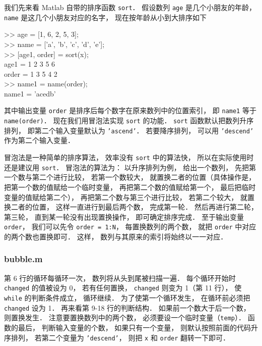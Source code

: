 

我们先来看 Matlab 自带的排序函数 \texttt{sort}． 假设数列 \texttt{age} 是几个小朋友的年龄， \texttt{name} 是这几个小朋友对应的名字， 现在按年龄从小到大排序如下
\begin{Command}
>> age = [1, 6, 2, 5, 3];\\
>> name = ['a', 'b', 'c', 'd', 'e'];\\
>> [age1, order] = sort(x);\\
age1 = 1 2 3 5 6\\
order = 1 3 5 4 2\\
>> name1 = name(order);\\
name1 = 'acedb'
\end{Command}
其中输出变量 \texttt{order} 是排序后每个数字在原来数列中的位置索引， 即 \texttt{name1} 等于 \texttt{name(order)}． 现在我们用冒泡法实现 \texttt{sort} 的功能． \texttt{sort} 函数默认把数列升序排列， 即第二个输入变量默认为 \texttt{'ascend'}． 若要降序排列， 可以用 \texttt{'descend'} 作为第二个输入变量．

冒泡法是一种简单的排序算法， 效率没有 \texttt{sort} 中的算法快， 所以在实际使用时还是建议用 \texttt{sort}． 冒泡法的算法为： 以升序排列为例， 给出一个数列， 先把第一个数与第二个进行比较， 若第一个数较大， 就置换二者的位置（具体操作是， 把第一个数的值赋给一个临时变量， 再把第二个数的值赋给第一个， 最后把临时变量的值赋给第二个）， 再把第二个数与第三个进行比较， 若第二个较大， 就置换二者的位置， 这样一直进行到最后两个数， 完成第一轮． 然后再进行第二轮， 第三轮， 直到某一轮没有出现置换操作， 即可确定排序完成． 至于输出变量 \texttt{order}， 我们可以先令 \texttt{order = 1:N}， 每置换数列的两个数， 就把 \texttt{order} 中对应的两个数也置换即可． 这样， 数列与其原来的索引将始终以一一对应． 

\subsubsection{bubble.m}


第 6 行的循环每循环一次， 数列将从头到尾被扫描一遍． 每个循环开始时 \texttt{changed} 的值被设为 0， 若有任何置换， \texttt{changed} 则变为 1（第 11 行）， 使 \texttt{while} 的判断条件成立， 循环继续． 为了使第一个循环发生， 在循环前必须把 \texttt{changed} 设为 1． 再来看第 9-18 行的判断结构． 如果前一个数大于后一个数， 则置换发生． 注意要置换数列中的两个数， 必须要设一个临时变量（\texttt{temp}）． 函数的最后， 判断输入变量的个数， 如果只有一个变量， 则默认按照前面的代码升序排列， 若第二个变量为 \texttt{'descend'}， 则把 \texttt{x} 和 \texttt{order} 翻转一下即可．